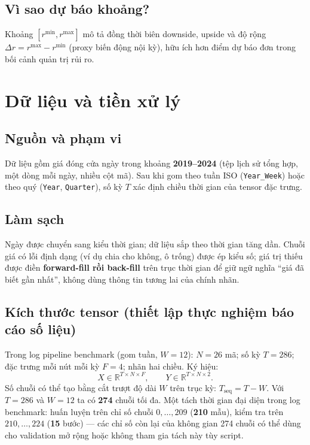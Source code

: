 \documentclass[12pt,a4paper]{article}
\begin{document}
\subsection{Vì sao dự báo khoảng?}
Khoảng $[r^{\min}, r^{\max}]$ mô tả đồng thời biên downside, upside và độ rộng $\Delta r = r^{\max}-r^{\min}$ (proxy biến động nội kỳ), hữu ích hơn điểm dự báo đơn trong bối cảnh quản trị rủi ro.

\section{Dữ liệu và tiền xử lý}

\subsection{Nguồn và phạm vi}
Dữ liệu gồm giá đóng cửa ngày trong khoảng \textbf{2019--2024} (tệp lịch sử tổng hợp, một dòng mỗi ngày, nhiều cột mã). Sau khi gom theo tuần ISO (\texttt{Year\_Week}) hoặc theo quý (\texttt{Year}, \texttt{Quarter}), số kỳ $T$ xác định chiều thời gian của tensor đặc trưng.

\subsection{Làm sạch}
Ngày được chuyển sang kiểu thời gian; dữ liệu sắp theo thời gian tăng dần. Chuỗi giá có lỗi định dạng (ví dụ chia cho không, ô trống) được ép kiểu số; giá trị thiếu được điền \textbf{forward-fill rồi back-fill} trên trục thời gian để giữ ngữ nghĩa ``giá đã biết gần nhất'', không dùng thông tin tương lai của chính nhãn.

\subsection{Kích thước tensor (thiết lập thực nghiệm báo cáo số liệu)}
Trong log pipeline benchmark (gom tuần, $W=12$): $N=26$ mã; số kỳ $T=286$; đặc trưng mỗi nút mỗi kỳ $F=4$; nhãn hai chiều. Ký hiệu:
\begin{equation}
  X \in \mathbb{R}^{T \times N \times F}, \qquad Y \in \mathbb{R}^{T \times N \times 2}.
\end{equation}
Số chuỗi có thể tạo bằng cắt trượt độ dài $W$ trên trục kỳ: $T_{\mathrm{seq}} = T - W$. Với $T=286$ và $W=12$ ta có \textbf{274} chuỗi tối đa. Một tách thời gian đại diện trong log benchmark: huấn luyện trên chỉ số chuỗi $0,\ldots,209$ (\textbf{210} mẫu), kiểm tra trên $210,\ldots,224$ (\textbf{15} bước) --- các chỉ số còn lại của không gian 274 chuỗi có thể dùng cho validation mở rộng hoặc không tham gia tách này tùy script.
\end{document}
